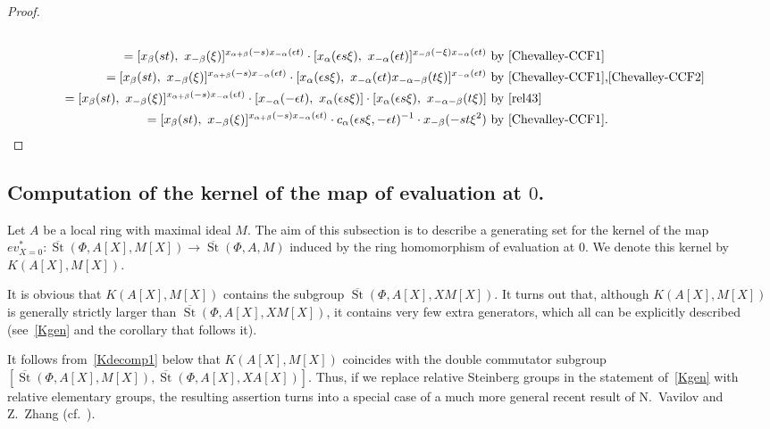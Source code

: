 \documentclass[oneside, 8pt]{amsart}
\theoremstyle{remark}
\theoremstyle{definition}
\numberwithin{lemma}{section}
\numberwithin{prop}{section}
\numberwithin{corollary}{section}
\numberwithin{externaltheorem}{section}
\DeclareMathOperator{\St}{St}
\numberwithin{equation}{section}
\begin{document}
\begin{proof}
\begin{align*}
\begin{split}
\end{split}\\
= [x_{\beta}(st),\ x_{-\beta}(\xi)] ^ {x_{\alpha+\beta}(-s) x_{-\alpha}(\epsilon t)} \cdot [x_{\alpha}(\epsilon s\xi),\ x_{-\alpha}(\epsilon t)]^{x_{-\beta}(-\xi)x_{-\alpha}(\epsilon t)} &\ \text{by~\eqref{Chevalley-CCF1}}\\
= [x_{\beta}(st),\ x_{-\beta}(\xi)] ^ {x_{\alpha+\beta}(-s) x_{-\alpha}(\epsilon t)} \cdot [x_{\alpha}(\epsilon s\xi),\ x_{-\alpha}(\epsilon t) x_{-\alpha-\beta}(t\xi)]^{x_{-\alpha}(\epsilon t)} &\ \text{by~\eqref{Chevalley-CCF1},\eqref{Chevalley-CCF2}}\\
= [x_{\beta}(st),\ x_{-\beta}(\xi)] ^ {x_{\alpha+\beta}(-s) x_{-\alpha}(\epsilon t)} \cdot [x_{-\alpha}(-\epsilon t),\ x_{\alpha}(\epsilon s\xi)] \cdot [x_{\alpha}(\epsilon s\xi),\ x_{-\alpha-\beta}(t\xi)] &\ \text{by~\eqref{rel43}}\\
= [x_{\beta}(st),\ x_{-\beta}(\xi)] ^ {x_{\alpha+\beta}(-s) x_{-\alpha}(\epsilon t)} \cdot c_{\alpha}(\epsilon s\xi, -\epsilon t)^{-1} \cdot x_{-\beta}(-st\xi^2)  &\ \text{by~\eqref{Chevalley-CCF1}}. \qedhere
\end{align*}


\end{proof}

\subsection{Computation of the kernel of the map of evaluation at $0$.}\label{sec:computationOfK}
Let $A$ be a local ring with maximal ideal $M$.
The aim of this subsection is to describe a generating set for the kernel of the map $ev_{X=0}^*\colon\overline{\St}(\Phi, A[X], M[X]) \to \overline{\St}(\Phi, A, M)$
induced by the ring homomorphism of evaluation at $0$. We denote this kernel by $K(A[X], M[X])$.

It is obvious that $K(A[X], M[X])$ contains the subgroup $\overline{\St}(\Phi, A[X], XM[X])$.
It turns out that, although $K(A[X], M[X])$ is generally strictly larger than $\overline{\St}(\Phi, A[X], XM[X])$,
 it contains very few extra generators, which all can be explicitly described (see~\cref{Kgen} and the corollary that follows it). 

It follows from~\cref{Kdecomp1} below that $K(A[X], M[X])$ coincides with the double commutator subgroup $[\overline{\St}(\Phi, A[X], M[X]), \overline{\St}(\Phi, A[X], XA[X])].$ Thus, if we replace relative Steinberg groups in the statement of~\cref{Kgen} with relative elementary groups, the resulting assertion turns into a special case of a much more general recent result of N.~Vavilov and Z.~Zhang (cf.~\cite[Theorem~1]{VZ18}).
\end{document}
